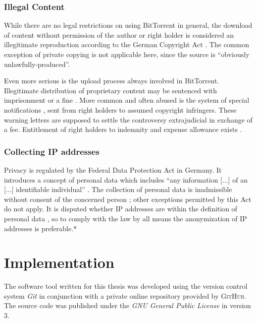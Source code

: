 \documentclass[10pt, a4paper, twoside, headsepline]{scrbook}
\renewcommand{\_}{\origunderscore\allowbreak}
\begin{document}
\subsection{Illegal Content}
While there are no legal restrictions on using BitTorrent in general, the download of content without permission of the author or right holder is considered an illegitimate reproduction according to the German Copyright Act \cite[art.~15\,(1),~16]{urhg}. The common exception of private copying \cite[art.~53]{urhg} is not applicable here, since the source is ``obviously unlawfully-produced''.

Even more serious is the upload process always involved in BitTorrent. Illegitimate distribution of proprietary content may be sentenced with imprisonment or a fine \cite[art.~106]{urhg}. More common and often abused \cite{abmahnung} is the system of special notifications \cite[art.~97a]{urhg}, sent from right holders to assumed copyright infringers. These warning letters are supposed to settle the controversy extrajudicial in exchange of a fee. Entitlement of right holders to indemnity and expense allowance exists \cite[art.~97]{urhg}.

\subsection{Collecting IP addresses}
Privacy is regulated by the Federal Data Protection Act \cite{bdsg} in Germany. It introduces a concept of personal data which includes ``any information [...] of an [...] identifiable individual'' \cite[sec.~3\,(1)]{bdsg}. The collection of personal data is inadmissible without consent of the concerned person \cite[sec.~4]{bdsg}; other exceptions permitted by this Act do not apply. It is disputed whether IP addresses are within the definition of personal data \cite{ip}, so to comply with the law by all means the anonymization of IP addresses is preferable.*

\chapter{Implementation}
The software tool written for this thesis was developed using the version control system \emph{Git} \cite{git} in conjunction with a private online repository provided by \textsc{GitHub}. The source code was published \cite{btda} under the \emph{GNU General Public License} in version 3.
\end{document}
